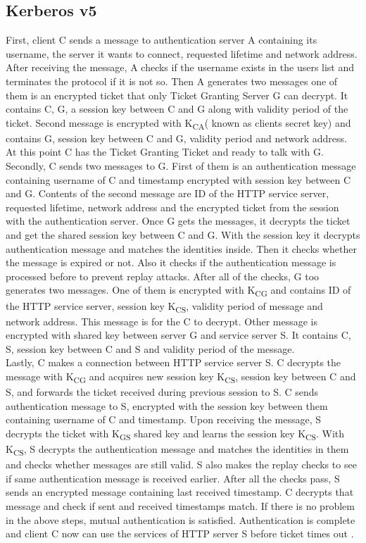 \documentclass[a4paper, 12pt, titlepage]{article}
\begin{document}
\subsection{Kerberos v5}
First, client C sends a message to authentication server A containing its username, the server it wants to connect, requested lifetime and network address. After receiving the message, A checks if the username exists in the users list and terminates the protocol if it is not so. Then A generates two messages one of them is an encrypted ticket that only Ticket Granting Server G can decrypt. It contains C, G, a session key between C and G along with validity period of the ticket. Second message is encrypted with K\textsubscript{CA}( known as clients secret key) and contains G, session key between C and G, validity period and network address. At this point C has the Ticket Granting Ticket and ready to talk with G.
\bigskip
\\Secondly, C sends two messages to G. First of them is an authentication message containing username of C and timestamp encrypted with session key between C and G. Contents of the second message are ID of the HTTP service server, requested lifetime, network address and the encrypted ticket from the session with the authentication server. Once G gets the messages, it decrypts the ticket and get the shared session key between C and G. With the session key it decrypts authentication message and matches the identities inside. Then it checks whether the message is expired or not. Also it checks if the  authentication message is processed before to prevent replay attacks. After all of the checks, G too generates two messages. One of them is encrypted with K\textsubscript{CG} and contains ID of the HTTP service server, session key K\textsubscript{CS}, validity period of message and network address. This message is for the C to decrypt. Other message is encrypted with shared key between server G and service server S. It contains C, S, session key between C and S and validity period of the message.
\bigskip
\\Lastly, C makes a connection between HTTP service server S. C decrypts the message with K\textsubscript{CG} and acquires new session key K\textsubscript{CS}, session key between C and S, and forwards the ticket received during previous session to S. C sends authentication message to S, encrypted with the session key between them containing username of C and timestamp. Upon receiving the message, S decrypts the ticket with K\textsubscript{GS} shared key and learns the session key K\textsubscript{CS}. With K\textsubscript{CS}, S decrypts the authentication message and matches the identities in them and checks whether messages are still valid. S also makes the replay checks to see if same authentication message is received earlier. After all the checks pass, S sends an encrypted message containing last received timestamp. C decrypts that message and check if sent and received timestamps match. If there is no problem in the above steps, mutual authentication is satisfied. Authentication is complete and client C now can use the services of HTTP server S before ticket times out \cite{kerb5}.
\end{document}
